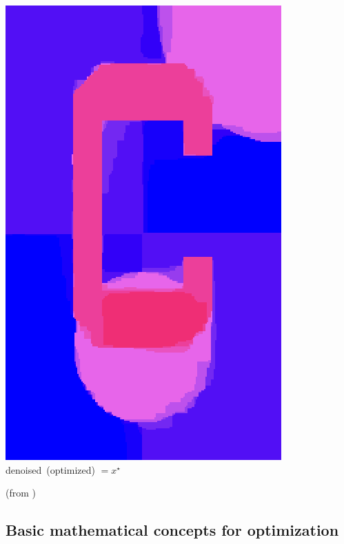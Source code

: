 \documentclass[12pt]{beamer}
\begin{document}
\begin{frame}
\begin{center}
\begin{minipage}[t]{0.2\textwidth}
\includegraphics[width=\textwidth]{c_denoised.png} \\
{\small \mbox{denoised (optimized)} $=x^\star$}
\end{minipage}
\mbox{\quad}
\end{center}
{\scriptsize (from \cite{ravikumar17}) \hfill}
\end{frame}


\subsection{Basic mathematical concepts for optimization}
\end{document}
